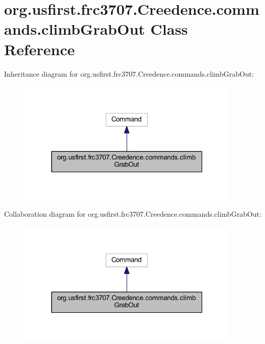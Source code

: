 \hypertarget{classorg_1_1usfirst_1_1frc3707_1_1_creedence_1_1commands_1_1climb_grab_out}{}\section{org.\+usfirst.\+frc3707.\+Creedence.\+commands.\+climb\+Grab\+Out Class Reference}
\label{classorg_1_1usfirst_1_1frc3707_1_1_creedence_1_1commands_1_1climb_grab_out}


Inheritance diagram for org.\+usfirst.\+frc3707.\+Creedence.\+commands.\+climb\+Grab\+Out\+:
\nopagebreak
\begin{figure}[H]
\begin{center}
\leavevmode
\includegraphics[width=301pt]{classorg_1_1usfirst_1_1frc3707_1_1_creedence_1_1commands_1_1climb_grab_out__inherit__graph}
\end{center}
\end{figure}


Collaboration diagram for org.\+usfirst.\+frc3707.\+Creedence.\+commands.\+climb\+Grab\+Out\+:
\nopagebreak
\begin{figure}[H]
\begin{center}
\leavevmode
\includegraphics[width=301pt]{classorg_1_1usfirst_1_1frc3707_1_1_creedence_1_1commands_1_1climb_grab_out__coll__graph}
\end{center}
\end{figure}

